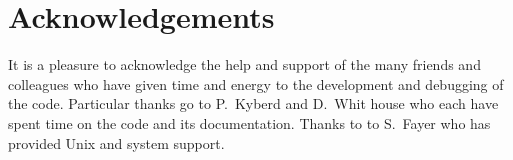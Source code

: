 \section*{Acknowledgements}

It is a pleasure to acknowledge the help and support of the many
friends and colleagues who have given time and energy to the
development and debugging of the code.
Particular thanks go to P.~Kyberd and D.~Whit house who each have
spent time on the code and its documentation.
Thanks to to S.~Fayer who has provided Unix and system support.
